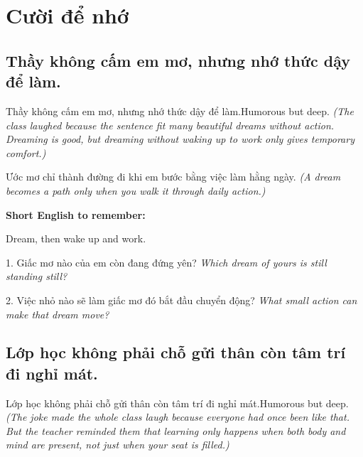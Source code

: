 \chapter{Cười để nhớ}

\section{Thầy không cấm em mơ, nhưng nhớ thức dậy để làm.}
\begin{truyen}{Thầy không cấm em mơ, nhưng nhớ thức dậy để làm.}{Humorous but deep.}
\textit{(The class laughed because the sentence fit many beautiful dreams without action. Dreaming is good, but dreaming without waking up to work only gives temporary comfort.)}
\end{truyen}

\begin{baihoc}
Ước mơ chỉ thành đường đi khi em bước bằng việc làm hằng ngày.
\textit{(A dream becomes a path only when you walk it through daily action.)}
\end{baihoc}

\begin{ghinhoanh}
\textbf{Short English to remember:}

Dream, then wake up and work.

\end{ghinhoanh}

\begin{tuhocnhanh}
1. Giấc mơ nào của em còn đang đứng yên? \textit{Which dream of yours is still standing still?}

2. Việc nhỏ nào sẽ làm giấc mơ đó bắt đầu chuyển động? \textit{What small action can make that dream move?}
\end{tuhocnhanh}
\ngancach

\section{Lớp học không phải chỗ gửi thân còn tâm trí đi nghỉ mát.}
\begin{truyen}{Lớp học không phải chỗ gửi thân còn tâm trí đi nghỉ mát.}{Humorous but deep.}
\textit{(The joke made the whole class laugh because everyone had once been like that. But the teacher reminded them that learning only happens when both body and mind are present, not just when your seat is filled.)}
\end{truyen}


